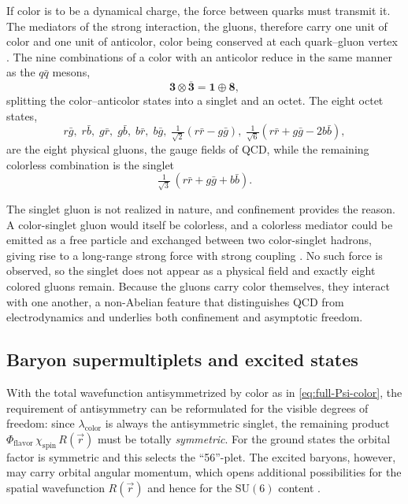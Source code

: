 If color is to be a dynamical charge, the force between quarks must transmit it. The
mediators of the strong interaction, the gluons, therefore carry one unit of color and
one unit of anticolor, color being conserved at each quark--gluon vertex
\cite[Ch.~10]{Amsler2018}. The nine combinations of a color with an anticolor reduce
in the same manner as the $q\bar q$ mesons,
\begin{equation}
    \mathbf{3} \otimes \overline{\mathbf{3}} = \mathbf{1} \oplus \mathbf{8},
\end{equation}
splitting the color--anticolor states into a singlet and an octet. The eight octet
states,
\begin{equation}
    r\bar g,\; r\bar b,\; g\bar r,\; g\bar b,\; b\bar r,\; b\bar g,\;
    \tfrac{1}{\sqrt{2}}(r\bar r - g\bar g),\;
    \tfrac{1}{\sqrt{6}}(r\bar r + g\bar g - 2 b\bar b),
\end{equation}
are the eight physical gluons, the gauge fields of QCD, while the remaining colorless
combination is the singlet
\begin{equation}
    \tfrac{1}{\sqrt{3}}\,(r\bar r + g\bar g + b\bar b).
\end{equation}

The singlet gluon is not realized in nature, and confinement provides the reason. A
color-singlet gluon would itself be colorless, and a colorless mediator could be
emitted as a free particle and exchanged between two color-singlet hadrons, giving rise
to a long-range strong force with strong coupling \cite[Ch.~10]{Amsler2018}. No such
force is observed, so the singlet does not appear as a physical field and exactly eight
colored gluons remain. Because the gluons carry color themselves, they interact with one
another, a non-Abelian feature that distinguishes QCD from electrodynamics and underlies
both confinement and asymptotic freedom.

\FloatBarrier

\subsection{Baryon supermultiplets and excited states}
\label{subsec:supermultiplets}

With the total wavefunction antisymmetrized by color as in \eqref{eq:full-Psi-color},
the requirement of antisymmetry can be reformulated for the visible degrees of freedom:
since $\lambda_{\text{color}}$ is always the antisymmetric singlet, the remaining product
$\Phi_{\text{flavor}}\,\chi_{\text{spin}}\,R(\vec{r})$ must be totally
\emph{symmetric}. For the ground states the orbital factor is symmetric and this selects
the ``56''-plet. The excited baryons, however, may carry orbital angular momentum, which
opens additional possibilities for the spatial wavefunction $R(\vec{r})$ and hence for the
$\mathrm{SU}(6)$ content \cite[Ch.~15]{Amsler2018}.

